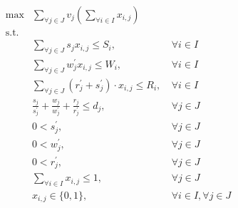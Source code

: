 \begin{align}
    \max & \sum_{\forall j \in J} v_j \left(\sum_{\forall i \in I} x_{i,j}\right) \label{eq:objective} \\
    \mbox{s.t.} \nonumber \\
    & \sum_{\forall j \in J} s_j x_{i,j} \leq S_i, &~ \forall{i \in I} \label{eq:server-storage-constraint} \\
    & \sum_{\forall j \in J} w^{'}_j x_{i,j} \leq W_i, &~ \forall{i \in I} \label{eq:server-computation-constraint} \\
    & \sum_{\forall j \in J} (r^{'}_j + s^{'}_j) \cdot x_{i,j} \leq R_i, &~ \forall{i \in I} \label{eq:server-bandwidth-constraint} \\
    & \frac{s_j}{s^{'}_j} + \frac{w_j}{w^{'}_j} + \frac{r_j}{r^{'}_j} \leq d_j, &~ \forall{j \in J} \label{eq:task-deadline} \\
    & 0 < s^{'}_j, &~ \forall{j \in J} \label{eq:loading-speeds} \\
    & 0 < w^{'}_j, &~ \forall{j \in J} \label{eq:compute-speeds} \\
    & 0 < r^{'}_j, &~ \forall{j \in J} \label{eq:sending-speeds} \\
    & \sum_{\forall i \in I} x_{i,j} \leq 1, &~ \forall{j \in J} \label{eq:server-task-allocation} \\
    & x_{i,j} \in \{0, 1\}, &~ \forall{i \in I},\forall{j \in J} \label{eq:task-allocation}
\end{align}

